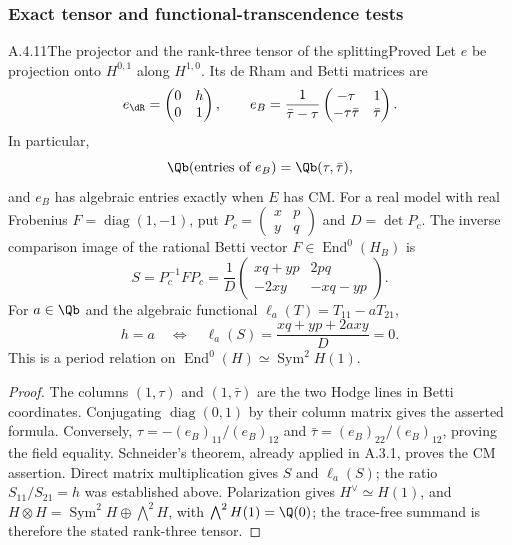 \subsubsection{Exact tensor and functional-transcendence tests}

\begin{result}{A.4.11}{The projector and the rank-three tensor of the splitting}{Proved}
Let $e$ be projection onto $H^{0,1}$ along $H^{1,0}$. Its de Rham and Betti matrices are
\[
 e_{\dR}=\begin{pmatrix}0&h\\0&1\end{pmatrix},\qquad
 e_B=\frac1{\bar\tau-\tau}
 \begin{pmatrix}-\tau&1\\-\tau\bar\tau&\bar\tau\end{pmatrix}.
\]
In particular,
\[
 \Qb(\text{entries of }e_B)=\Qb(\tau,\bar\tau),
\]
and $e_B$ has algebraic entries exactly when $E$ has CM.
For a real model with real Frobenius $F=\operatorname{diag}(1,-1)$, put
$P_c=\left(\begin{smallmatrix}x&p\\y&q\end{smallmatrix}\right)$ and $D=\det P_c$. The inverse comparison image of the rational Betti vector $F\in\operatorname{End}^0(H_B)$ is
\[
 S=P_c^{-1}FP_c
 =\frac1D\begin{pmatrix}xq+yp&2pq\\-2xy&-xq-yp\end{pmatrix}.
\]
For $a\in\Qb$ and the algebraic functional $\ell_a(T)=T_{11}-aT_{21}$,
\[
 h=a\quad\Longleftrightarrow\quad
 \ell_a(S)=\frac{xq+yp+2axy}{D}=0.
\]
This is a period relation on
$\operatorname{End}^0(H)\simeq\operatorname{Sym}^2H(1)$.
\end{result}
\begin{proof}
The columns $(1,\tau)$ and $(1,\bar\tau)$ are the two Hodge lines in Betti coordinates. Conjugating $\operatorname{diag}(0,1)$ by their column matrix gives the asserted formula. Conversely,
$\tau=-(e_B)_{11}/(e_B)_{12}$ and $\bar\tau=(e_B)_{22}/(e_B)_{12}$, proving the field equality. Schneider's theorem, already applied in A.3.1, proves the CM assertion. Direct matrix multiplication gives $S$ and $\ell_a(S)$; the ratio $S_{11}/S_{21}=h$ was established above. Polarization gives $H^\vee\simeq H(1)$, and
$H\otimes H=\operatorname{Sym}^2H\oplus\bigwedge^2H$, with $\bigwedge^2H(1)=\Q(0)$; the trace-free summand is therefore the stated rank-three tensor.
\end{proof}

